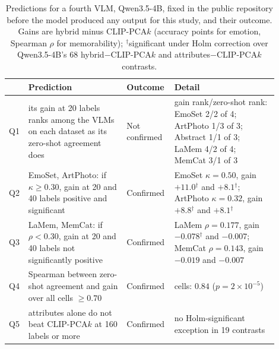 \begin{table}[t]
\centering
\caption{Predictions for a fourth VLM, Qwen3.5-4B, fixed in the public repository before the model produced any output for this study, and their outcome. Gains are hybrid minus CLIP-PCA$k$ (accuracy points for emotion, Spearman $\rho$ for memorability); $^{\dagger}$significant under Holm correction over Qwen3.5-4B's 68 hybrid$-$CLIP-PCA$k$ and attributes$-$CLIP-PCA$k$ contrasts.}
\label{tab:prereg35}
\small
\begin{tabular}{@{}>{\raggedright\arraybackslash}p{0.05\linewidth}>{\raggedright\arraybackslash}p{0.35\linewidth}>{\raggedright\arraybackslash}p{0.13\linewidth}>{\raggedright\arraybackslash}p{0.37\linewidth}@{}}
\toprule
& Prediction & Outcome & Detail \\
\midrule
Q1 & its gain at 20 labels ranks among the VLMs on each dataset as its zero-shot agreement does & Not confirmed & gain rank/zero-shot rank: EmoSet 2/2 of 4; ArtPhoto 1/3 of 3; Abstract 1/1 of 3; LaMem 4/2 of 4; MemCat 3/1 of 3 \\
Q2 & EmoSet, ArtPhoto: if $\kappa \ge 0.30$, gain at 20 and 40 labels positive and significant & Confirmed & EmoSet $\kappa = 0.50$, gain $+11.0$$^{\dagger}$ and $+8.1$$^{\dagger}$; ArtPhoto $\kappa = 0.32$, gain $+8.8$$^{\dagger}$ and $+8.1$$^{\dagger}$ \\
Q3 & LaMem, MemCat: if $\rho < 0.30$, gain at 20 and 40 labels not significantly positive & Confirmed & LaMem $\rho = 0.177$, gain $-0.078$$^{\dagger}$ and $-0.007$; MemCat $\rho = 0.143$, gain $-0.019$ and $-0.007$ \\
Q4 & Spearman between zero-shot agreement and gain over all cells $\ge 0.70$ & Confirmed & 17 cells: $0.84$ ($p = 2 \times 10^{-5}$) \\
Q5 & attributes alone do not beat CLIP-PCA$k$ at 160 labels or more & Confirmed & no Holm-significant exception in 19 contrasts \\
\bottomrule
\end{tabular}
\end{table}
